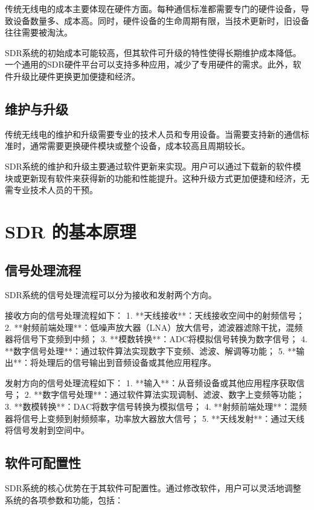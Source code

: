 ﻿\documentclass[UTF8]{ctexbook}
\begin{document}
传统无线电的成本主要体现在硬件方面。每种通信标准都需要专门的硬件设备，导致设备数量多、成本高。同时，硬件设备的生命周期有限，当技术更新时，旧设备往往需要被淘汰。

SDR系统的初始成本可能较高，但其软件可升级的特性使得长期维护成本降低。一个通用的SDR硬件平台可以支持多种应用，减少了专用硬件的需求。此外，软件升级比硬件更换更加便捷和经济。

\subsection{维护与升级}

传统无线电的维护和升级需要专业的技术人员和专用设备。当需要支持新的通信标准时，通常需要更换硬件模块或整个设备，成本较高且周期较长。

SDR系统的维护和升级主要通过软件更新来实现。用户可以通过下载新的软件模块或更新现有软件来获得新的功能和性能提升。这种升级方式更加便捷和经济，无需专业技术人员的干预。
\section{SDR 的基本原理}

\subsection{信号处理流程}

SDR系统的信号处理流程可以分为接收和发射两个方向。

接收方向的信号处理流程如下：
1. **天线接收**：天线接收空间中的射频信号；
2. **射频前端处理**：低噪声放大器（LNA）放大信号，滤波器滤除干扰，混频器将信号下变频到中频；
3. **模数转换**：ADC将模拟信号转换为数字信号；
4. **数字信号处理**：通过软件算法实现数字下变频、滤波、解调等功能；
5. **输出**：将处理后的信号输出到音频设备或其他应用程序。

发射方向的信号处理流程如下：
1. **输入**：从音频设备或其他应用程序获取信号；
2. **数字信号处理**：通过软件算法实现调制、滤波、数字上变频等功能；
3. **数模转换**：DAC将数字信号转换为模拟信号；
4. **射频前端处理**：混频器将信号上变频到射频频率，功率放大器放大信号；
5. **天线发射**：通过天线将信号发射到空间中。

\subsection{软件可配置性}

SDR系统的核心优势在于其软件可配置性。通过修改软件，用户可以灵活地调整系统的各项参数和功能，包括：
\end{document}
